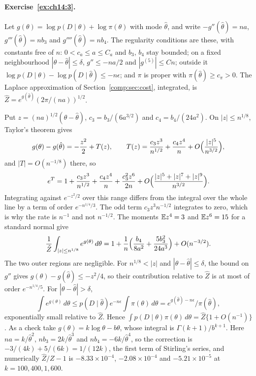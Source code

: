 \paragraph{Exercise~\ref{ex:ch14:3}.} Let $g(\theta) = \log p(D \mid \theta) + \log\pi(\theta)$ with mode $\hat\theta$, and write $-g''(\hat\theta) = na$, $g'''(\hat\theta) = nb_3$ and $g''''(\hat\theta) = nb_4$. The regularity conditions are these, with constants free of $n$: $0 < c_a \leq a \leq C_a$ and $b_3$, $b_4$ stay bounded; on a fixed neighbourhood $|\theta - \hat\theta| \leq \delta$, $g'' \leq -na/2$ and $|g^{(5)}| \leq Cn$; outside it $\log p(D \mid \theta) - \log p(D \mid \hat\theta) \leq -n\epsilon$; and $\pi$ is proper with $\pi(\hat\theta) \geq c_\pi > 0$. The Laplace approximation of Section~\ref{comp:sec:cost}, integrated, is $\hat Z = e^{g(\hat\theta)}(2\pi/(na))^{1/2}$.

Put $z = (na)^{1/2}(\theta - \hat\theta)$, $c_3 = b_3/(6a^{3/2})$ and $c_4 = b_4/(24a^2)$. On $|z| \leq n^{1/8}$, Taylor's theorem gives
\[
g(\theta) - g(\hat\theta) = -\frac{z^2}{2} + T(z), \qquad T(z) = \frac{c_3z^3}{n^{1/2}} + \frac{c_4z^4}{n} + O\Bigl(\frac{|z|^5}{n^{3/2}}\Bigr),
\]
and $|T| = O(n^{-1/8})$ there, so
\[
e^{T} = 1 + \frac{c_3z^3}{n^{1/2}} + \frac{c_4z^4}{n} + \frac{c_3^2z^6}{2n} + O\Bigl(\frac{|z|^5 + |z|^7 + |z|^9}{n^{3/2}}\Bigr).
\]
Integrating against $e^{-z^2/2}$ over this range differs from the integral over the whole line by a term of order $e^{-n^{1/4}/3}$. The odd term $c_3z^3n^{-1/2}$ integrates to zero, which is why the rate is $n^{-1}$ and not $n^{-1/2}$. The moments $\mathbb{E} z^4 = 3$ and $\mathbb{E} z^6 = 15$ for a standard normal give
\[
\frac{1}{\hat Z}\int_{|z| \leq n^{1/8}} e^{g(\theta)}\,d\theta = 1 + \frac{1}{n}\Bigl(\frac{b_4}{8a^2} + \frac{5b_3^2}{24a^3}\Bigr) + O(n^{-3/2}).
\]
The two outer regions are negligible. For $n^{1/8} < |z|$ and $|\theta - \hat\theta| \leq \delta$, the bound on $g''$ gives $g(\theta) - g(\hat\theta) \leq -z^2/4$, so their contribution relative to $\hat Z$ is at most of order $e^{-n^{1/4}/5}$. For $|\theta - \hat\theta| > \delta$,
\[
\int e^{g(\theta)}\,d\theta \leq p(D \mid \hat\theta)e^{-n\epsilon}\int\pi(\theta)\,d\theta = e^{g(\hat\theta) - n\epsilon}/\pi(\hat\theta),
\]
exponentially small relative to $\hat Z$. Hence $\int p(D \mid \theta)\pi(\theta)\,d\theta = \hat Z\{1 + O(n^{-1})\}$. As a check take $g(\theta) = k\log\theta - b\theta$, whose integral is $\Gamma(k + 1)/b^{k + 1}$. Here $na = k/\hat\theta^2$, $nb_3 = 2k/\hat\theta^3$ and $nb_4 = -6k/\hat\theta^4$, so the correction is $-3/(4k) + 5/(6k) = 1/(12k)$, the first term of Stirling's series, and numerically $\hat Z/Z - 1$ is $-8.33\times 10^{-4}$, $-2.08\times 10^{-4}$ and $-5.21\times 10^{-5}$ at $k = 100, 400, 1{,}600$.

